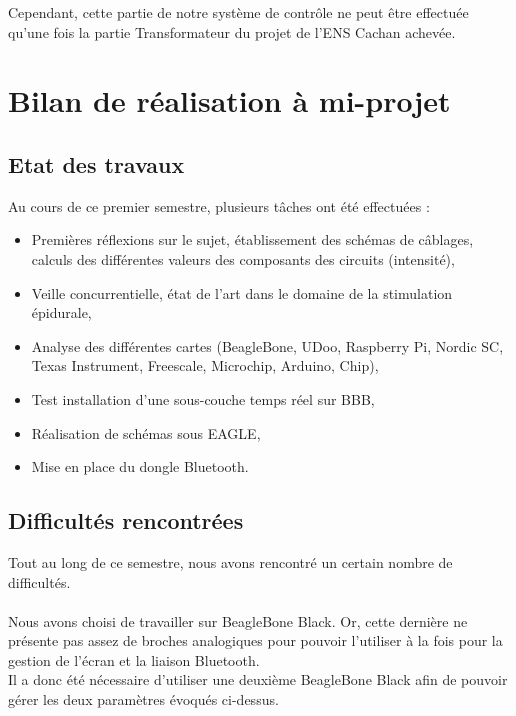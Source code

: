 \documentclass{report}
\begin{document}
Cependant, cette partie de notre syst\`{e}me de contrôle ne peut \^{e}tre effectu\'{e}e qu’une fois la
partie Transformateur du projet de l’ENS Cachan achev\'{e}e.

\chapter{Bilan de r\'{e}alisation \`{a} mi-projet}

\section{Etat des travaux}

Au cours de ce premier semestre, plusieurs t\^{a}ches ont \'{e}t\'{e} effectu\'{e}es : \\
\begin{itemize}
 \item Premi\`{e}res r\'{e}flexions sur le sujet, \'{e}tablissement des sch\'{e}mas de c\^{a}blages, calculs des
diff\'{e}rentes valeurs des composants des circuits (intensit\'{e}),
\item Veille concurrentielle, \'{e}tat de l’art dans le domaine de la stimulation \'{e}pidurale,
\item Analyse des diff\'{e}rentes cartes (BeagleBone, UDoo, Raspberry Pi, Nordic SC, Texas
Instrument, Freescale, Microchip, Arduino, Chip),
\item Test installation d’une sous-couche temps r\'{e}el sur BBB,
\item R\'{e}alisation de sch\'{e}mas sous EAGLE,
\item Mise en place du dongle Bluetooth.
\end{itemize}

\section{Difficult\'{e}s rencontr\'{e}es}

Tout au long de ce semestre, nous avons rencontr\'{e} un certain nombre de difficult\'{e}s.\\ \\

Nous avons choisi de travailler sur BeagleBone Black. Or, cette derni\`{e}re ne pr\'{e}sente pas
assez de broches analogiques pour pouvoir l’utiliser \`{a} la fois pour la gestion de l’\'{e}cran et la
liaison Bluetooth.\\
Il a donc \'{e}t\'{e} n\'{e}cessaire d’utiliser une deuxi\`{e}me BeagleBone Black afin de pouvoir g\'{e}rer les
deux param\`{e}tres \'{e}voqu\'{e}s ci-dessus.\\ \\
\end{document}
